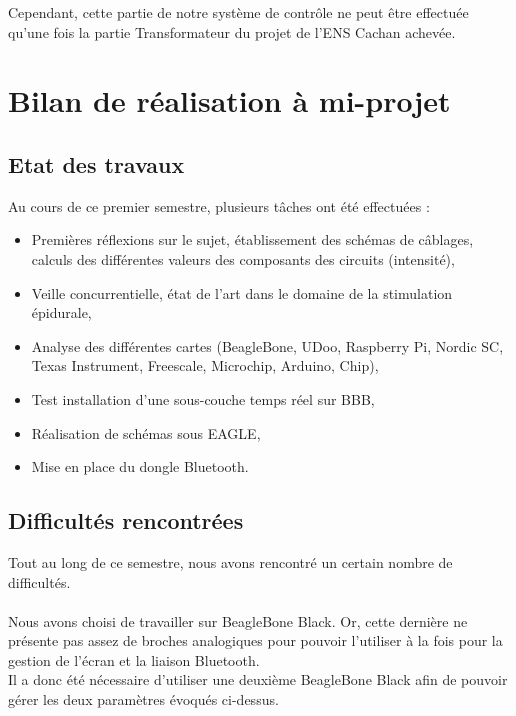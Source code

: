 \documentclass{report}
\begin{document}
Cependant, cette partie de notre syst\`{e}me de contrôle ne peut \^{e}tre effectu\'{e}e qu’une fois la
partie Transformateur du projet de l’ENS Cachan achev\'{e}e.

\chapter{Bilan de r\'{e}alisation \`{a} mi-projet}

\section{Etat des travaux}

Au cours de ce premier semestre, plusieurs t\^{a}ches ont \'{e}t\'{e} effectu\'{e}es : \\
\begin{itemize}
 \item Premi\`{e}res r\'{e}flexions sur le sujet, \'{e}tablissement des sch\'{e}mas de c\^{a}blages, calculs des
diff\'{e}rentes valeurs des composants des circuits (intensit\'{e}),
\item Veille concurrentielle, \'{e}tat de l’art dans le domaine de la stimulation \'{e}pidurale,
\item Analyse des diff\'{e}rentes cartes (BeagleBone, UDoo, Raspberry Pi, Nordic SC, Texas
Instrument, Freescale, Microchip, Arduino, Chip),
\item Test installation d’une sous-couche temps r\'{e}el sur BBB,
\item R\'{e}alisation de sch\'{e}mas sous EAGLE,
\item Mise en place du dongle Bluetooth.
\end{itemize}

\section{Difficult\'{e}s rencontr\'{e}es}

Tout au long de ce semestre, nous avons rencontr\'{e} un certain nombre de difficult\'{e}s.\\ \\

Nous avons choisi de travailler sur BeagleBone Black. Or, cette derni\`{e}re ne pr\'{e}sente pas
assez de broches analogiques pour pouvoir l’utiliser \`{a} la fois pour la gestion de l’\'{e}cran et la
liaison Bluetooth.\\
Il a donc \'{e}t\'{e} n\'{e}cessaire d’utiliser une deuxi\`{e}me BeagleBone Black afin de pouvoir g\'{e}rer les
deux param\`{e}tres \'{e}voqu\'{e}s ci-dessus.\\ \\
\end{document}
